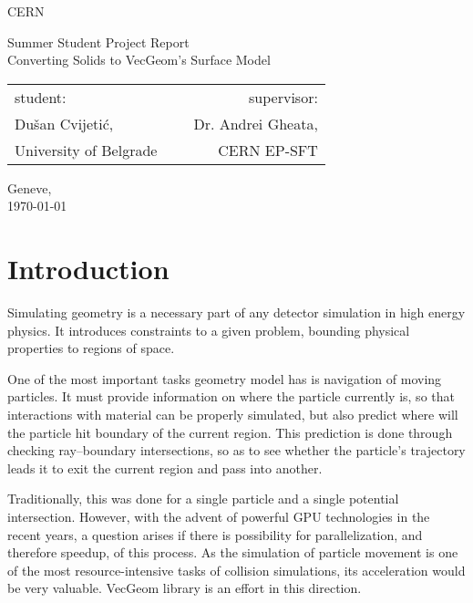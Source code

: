 \documentclass[12pt, a4paper]{article}
\begin{document}
	
\thispagestyle{empty}
{ \centering
	CERN
	\vspace*{0.5cm}
	
	\footnotesize
	Summer Student Project Report\\
	\huge
	{\sc Converting Solids to VecGeom's Surface Model}\\
	\vspace{0.4cm}
	\footnotesize
	\begin{tabular}{l c r}
		student: & \hspace{3cm}\ & supervisor:\\
		Dušan Cvijetić\footnotemark, && Dr. Andrei Gheata, \\
		\scriptsize University of Belgrade && \scriptsize CERN EP-SFT
	\end{tabular}
	
	\normalsize
	\vspace{0.5cm}
	Geneve,\\
	\today
		
	
}

\vfill
\begin{abstract}
	\blindtext
\end{abstract}
\vfill

\newpage


\tableofcontents

\section{Introduction}

Simulating geometry is a necessary part of any detector simulation in high energy physics. It introduces constraints to a given problem, bounding physical properties to regions of space.

One of the most important tasks geometry model has is navigation of moving particles. It must provide information on where the particle currently is, so that interactions with material can be properly simulated, but also predict where will the particle hit boundary of the current region. This prediction is done through checking ray--boundary intersections, so as to see whether the particle's trajectory leads it to exit the current region and pass into another.

Traditionally, this was done for a single particle and a single potential intersection. However, with the advent of powerful GPU technologies in the recent years, a question arises if there is possibility for parallelization, and therefore speedup, of this process. As the simulation of particle movement is one of the most resource-intensive tasks of collision simulations, its acceleration would be very valuable. VecGeom library is an effort in this direction.
\end{document}
